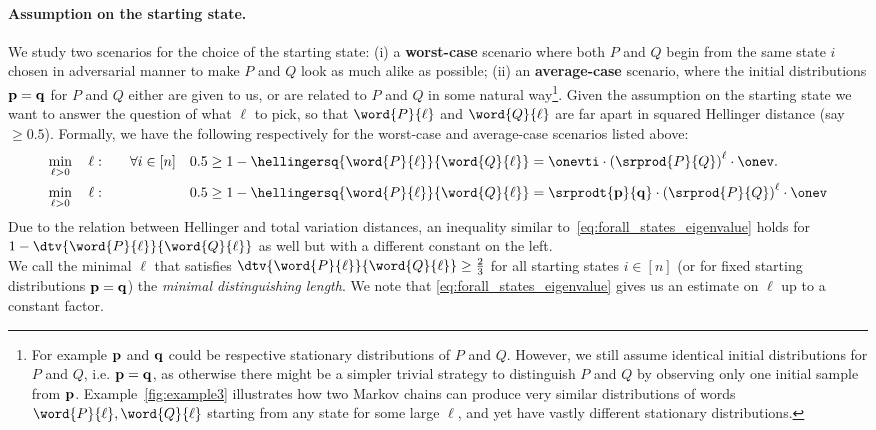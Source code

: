 \paragraph{Assumption on the starting state.} We study two scenarios for the choice of the starting state: (i) a {\bf worst-case} scenario where
both $P$ and $Q$ begin from the same state $i$ chosen in adversarial manner to make $P$ and $Q$ look as much alike as possible;
(ii) an {\bf average-case} scenario, where the initial distributions $\mathbf{p}=\mathbf{q}$ for $P$ and $Q$ either are given to us, or are related to $P$ and $Q$ in 
some natural way\footnote{For example $\mathbf{p}$ and $\mathbf{q}$ could be respective stationary distributions of $P$ and $Q$. However, we still assume identical initial distributions for $P$ and $Q$, i.e. $\mathbf{p}=\mathbf{q}$, as otherwise there might be a simpler trivial strategy to distinguish $P$ and $Q$ by observing only one initial sample from $\mathbf{p}$. Example~\ref{fig:example3} illustrates how 
two Markov chains can produce very similar distributions of words $\word{P}{\ell},\word{Q}{\ell}$ starting from any state for some large $\ell$, and yet have vastly 
different stationary distributions.}. 
Given the assumption on the starting state we want to answer the question of what $\ell$ to pick, so 
that $\word{P}{\ell}$ and $\word{Q}{\ell}$ are far apart in squared Hellinger distance (say $\ge 0.5$). 
Formally, we have the following respectively for the worst-case and average-case scenarios listed above:
\begin{align}
\label{eq:forall_states_eigenvalue}
\min_{\ell>0} \quad \ell:& \quad\quad \forall i\in[n] && 0.5 \ge 1-\hellingersq{\word{P}{\ell}}{\word{Q}{\ell}} = \onevti\circ \left(\srprod{P}{Q}\right)^{\ell} \circ \onev .\\
\min_{\ell>0} \quad \ell:  & && 0.5 \ge 1-\hellingersq{\word{P}{\ell}}{\word{Q}{\ell}} = \srprodt{\vect{p}}{\vect{q}}\circ \left(\srprod{P}{Q}\right)^{\ell} \circ \onev \nonumber
\end{align}
Due to the relation between Hellinger and total variation distances, an inequality similar to~\eqref{eq:forall_states_eigenvalue} holds
for $1-\dtv{\word{P}{\ell}}{\word{Q}{\ell}}$ as well but with a different constant on the left.\\

We call the minimal $\ell$ that satisfies $\dtv{\word{P}{\ell}}{\word{Q}{\ell}}\ge\frac{2}{3}$ for all starting states $i\in[n]$ (or for fixed starting distributions $\mathbf{p}=\mathbf{q}$)
the {\em minimal distinguishing length}. We note that \eqref{eq:forall_states_eigenvalue} gives us an estimate on $\ell$ up to a constant factor.

